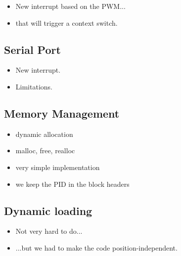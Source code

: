 \documentclass{beamer}
\begin{document}
    \begin{frame}
      \begin{itemize}
        \item New interrupt based on the PWM...
        \item that will trigger a context switch.
      \end{itemize}
    \end{frame}

    \subsection{Serial Port}

    \begin{frame}
      \begin{itemize}
        \item New interrupt.
        \item Limitations.
      \end{itemize}
    \end{frame}

    \subsection{Memory Management}
    
    \begin{frame}
      \begin{itemize}
        \item dynamic allocation
        \item malloc, free, realloc
        \item very simple implementation
        \item we keep the PID in the block headers
      \end{itemize}
    \end{frame}

    \subsection{Dynamic loading}
 
    \begin{frame}
      \begin{itemize}
        \item Not very hard to do...
        \item ...but we had to make the code position-independent.
      \end{itemize}
    \end{frame}
\end{document}
